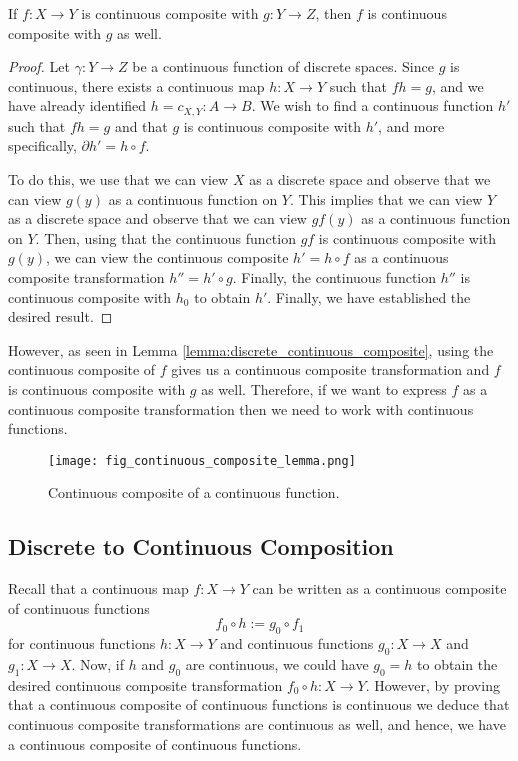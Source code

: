 \documentclass[a4paper,reqno,oneside]{article}
\begin{document}
\begin{lemma}\label{lemma:discrete_continuous_composite}
    If $f: X \to Y$ is continuous composite with $g: Y \to Z$, then $f$ is continuous composite with $g$ as well.
\end{lemma}
\begin{proof}
    Let $\gamma : Y \to Z$ be a continuous function of discrete spaces. Since $g$ is continuous, there exists a continuous map $h : X \to Y$ such that $fh = g$, and we have already identified $h = c_{X,Y} : A \to B$. We wish to find a continuous function $h'$ such that $fh = g$ and that $g$ is continuous composite with $h'$, and more specifically, $\partial{h'} = h \circ f$.
    
    To do this, we use that we can view $X$ as a discrete space and observe that we can view $g(y)$ as a continuous function on $Y$. This implies that we can view $Y$ as a discrete space and observe that we can view $gf(y)$ as a continuous function on $Y$. Then, using that the continuous function $gf$ is continuous composite with $g(y)$, we can view the continuous composite $h' = h \circ f$ as a continuous composite transformation $h'' = h' \circ g$. Finally, the continuous function $h''$ is continuous composite with $h_0$ to obtain $h'$. Finally, we have established the desired result.
\end{proof}

However, as seen in Lemma \ref{lemma:discrete_continuous_composite}, using the continuous composite of $f$ gives us a continuous composite transformation and $f$ is continuous composite with $g$ as well. Therefore, if we want to express $f$ as a continuous composite transformation then we need to work with continuous functions.

\begin{figure}[ht]
\centering
\texttt{[image: fig\_continuous\_composite\_lemma.png]}
\caption{Continuous composite of a continuous function.}
\label{fig:continuous_composite_lemma}
\end{figure}


\subsection*{Discrete to Continuous Composition}
Recall that a continuous map $f: X \to Y$ can be written as a continuous composite of continuous functions
$$f_{0} \circ h := g_{0} \circ f_{1}$$
for continuous functions $h : X \to Y$ and continuous functions $g_0 : X \to X$ and $g_1 : X \to X$. Now, if $h$ and $g_0$ are continuous, we could have $g_{0} = h$ to obtain the desired continuous composite transformation $f_{0} \circ h : X \to Y$. However, by proving that a continuous composite of continuous functions is continuous we deduce that continuous composite transformations are continuous as well, and hence, we have a continuous composite of continuous functions. 
\end{document}
